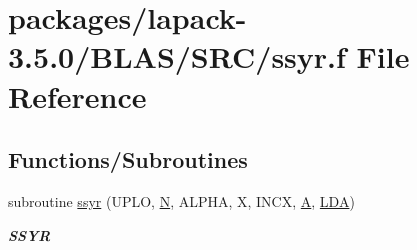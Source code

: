 \hypertarget{lapack-3_85_80_2BLAS_2SRC_2ssyr_8f}{}\section{packages/lapack-\/3.5.0/\+B\+L\+A\+S/\+S\+R\+C/ssyr.f File Reference}
\label{lapack-3_85_80_2BLAS_2SRC_2ssyr_8f}
\subsection*{Functions/\+Subroutines}
\begin{DoxyCompactItemize}
\item 
subroutine \hyperlink{group__single__blas__level2_ga7b8a99048765ed2bf7c1e770bff0b622}{ssyr} (U\+P\+L\+O, \hyperlink{polmisc_8c_a0240ac851181b84ac374872dc5434ee4}{N}, A\+L\+P\+H\+A, X, I\+N\+C\+X, \hyperlink{classA}{A}, \hyperlink{example__user_8c_ae946da542ce0db94dced19b2ecefd1aa}{L\+D\+A})
\begin{DoxyCompactList}\small\item\em {\bfseries S\+S\+Y\+R} \end{DoxyCompactList}\end{DoxyCompactItemize}
